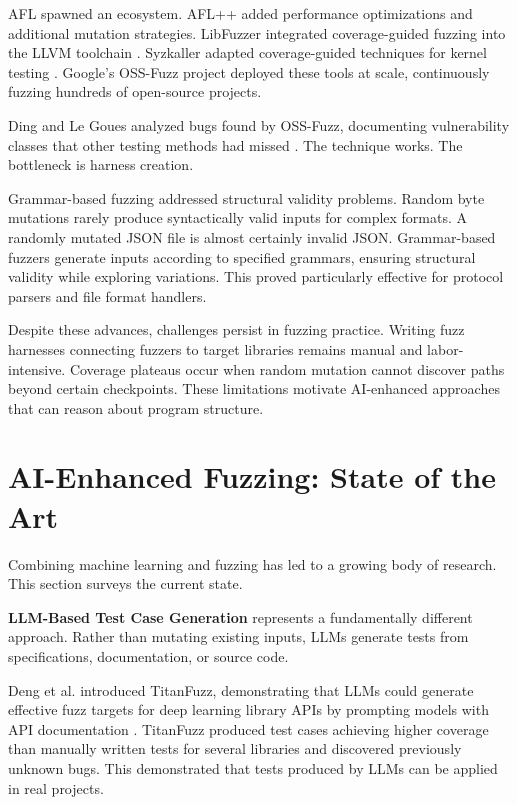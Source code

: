 AFL spawned an ecosystem. AFL++ added performance optimizations and additional mutation strategies. LibFuzzer integrated coverage-guided fuzzing into the LLVM toolchain \cite{LibFuzzer2015}. Syzkaller adapted coverage-guided techniques for kernel testing \cite{Syzkaller2020}. Google's OSS-Fuzz project deployed these tools at scale, continuously fuzzing hundreds of open-source projects.

Ding and Le Goues analyzed bugs found by OSS-Fuzz, documenting vulnerability classes that other testing methods had missed \cite{OSSFuzzBugs2021}. The technique works. The bottleneck is harness creation.

Grammar-based fuzzing addressed structural validity problems. Random byte mutations rarely produce syntactically valid inputs for complex formats. A randomly mutated JSON file is almost certainly invalid JSON. Grammar-based fuzzers generate inputs according to specified grammars, ensuring structural validity while exploring variations. This proved particularly effective for protocol parsers and file format handlers.

Despite these advances, challenges persist in fuzzing practice. Writing fuzz harnesses connecting fuzzers to target libraries remains manual and labor-intensive. Coverage plateaus occur when random mutation cannot discover paths beyond certain checkpoints. These limitations motivate AI-enhanced approaches that can reason about program structure.

\section{AI-Enhanced Fuzzing: State of the Art}
\label{sec:lit_ai_enhanced_fuzzing}

Combining machine learning and fuzzing has led to a growing body of research. This section surveys the current state.

\textbf{LLM-Based Test Case Generation} represents a fundamentally different approach. Rather than mutating existing inputs, LLMs generate tests from specifications, documentation, or source code.

Deng et al. introduced TitanFuzz, demonstrating that LLMs could generate effective fuzz targets for deep learning library APIs by prompting models with API documentation \cite{TitanFuzz2022}. TitanFuzz produced test cases achieving higher coverage than manually written tests for several libraries and discovered previously unknown bugs. This demonstrated that tests produced by LLMs can be applied in real projects.

